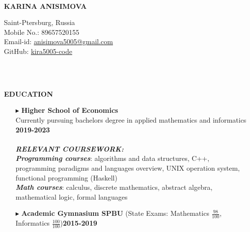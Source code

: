 \documentclass[a4paper,10pt]{article}
\begin{document}
	\hspace{0.5cm}\\[-0.2cm]
	\begin{minipage}{0.5\textwidth}
		\begin{flushleft}
			\huge \textbf{\* \* KARINA ANISIMOVA} 
			\normalsize
		\end{flushleft}
	\end{minipage}
	\begin{minipage}{0.51\textwidth}
		\begin{flushright}
			\textcolor[gray]{0.3}{
				\indent Saint-Ptersburg, Russia\\
				\indent Mobile No.: 89657520155  \\
				\indent Email-id: \href{mailto:anisimova5005@gmail.com} {anisimova5005@gmail.com}\\ 
				\indent GitHub: \href{https://github.com/Kira5005-code} {kira5005-code}\\  	
			}
		\end{flushright}
	\end{minipage}
	\\ \\
	
	
	
	\colorbox{magicmint}{
		\begin{minipage}{0.96\textwidth}
			\vphantom{.}
			\textbf{EDUCATION}
		\end{minipage}
	}
	
	\begin{itemize}
		\item [$\blacktriangleright$]  \textbf{Higher School of Economics}\\ Currently pursuing bachelors degree in applied mathematics and informatics \hspace{2.8cm} \textbf{2019-2023} \\ \\
		\textit{\textbf{RELEVANT COURSEWORK:}}\\
		\textit{\textbf{Programming courses}}{: algorithms and data structures, C++, programming paradigms and languages overview, UNIX operation system, functional programming (Haskell) }\\
		\textit{\textbf{Math courses}}{: calculus, discrete mathematics, abstract algebra, mathematical logic, formal languages}\\
		\item[$\blacktriangleright$]  \textbf{Academic Gymnasium SPBU} (State Exams: Mathematics $\frac{98}{100}$, Informatics $\frac{100}{100}$)\hspace{2.9cm}\textbf{2015-2019}
	\end{itemize}
	
\end{document}
